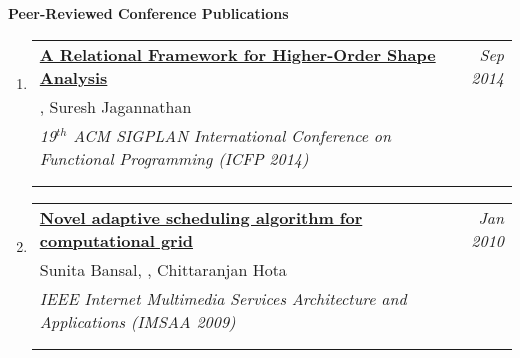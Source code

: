 \documentclass{article}
\makeatletter
\newenvironment{benumerate}[2]{
    \let\oldItem\item
    \def\item{\addtocounter{enumi}{-2}\oldItem}
    \begin{enumerate}[#2] \itemsep3pt
    \setcounter{enumi}{#1}
    \addtocounter{enumi}{1}}
  {\end{enumerate}}
\newenvironment{region}[3]{%
  {{\textbf{#1}}}
  \begin{benumerate}{#3}{\color{RoyalBlue}#2}}
  {\end{benumerate}\vspace{0.8ex}}
\newenvironment{publication}[6]
{ \item
  \begin{tabular*}{6.8in}{p{6in}@{\extracolsep{\fill}}r}
    \href{#1}{\textbf{#2}} & \textit{#3}\\ #4 &\\ \textit{#5}&\\
    \ifthenelse{\equal{#6}{}}{}{#6&\\}
  \end{tabular*}
} {}
\makeatother
\begin{document}
\begin{region} {Peer-Reviewed Conference Publications}{{C}1}{7}
  \begin{publication}{https://gowthamk.github.io/docs/icfp2014.pdf}
    {A Relational Framework for Higher-Order Shape Analysis}
    {Sep 2014}{\ugkaki, Suresh Jagannathan}
    {19$^{th}$ ACM SIGPLAN  International Conference on Functional Programming (ICFP 2014)}
    {Accceptance rate: 29\%}
  \end{publication}

  \begin{publication}{https://www.researchgate.net/publication/224127688_Novel_adaptive_scheduling_algorithm_for_computational_grid}
    {Novel adaptive scheduling algorithm for computational grid}
    {Jan 2010}{Sunita Bansal, \ugkaki, Chittaranjan Hota}
    {IEEE Internet Multimedia Services Architecture and Applications (IMSAA
    2009)}
    {Acceptance rate unknown}
  \end{publication}

\end{region}
\end{document}
